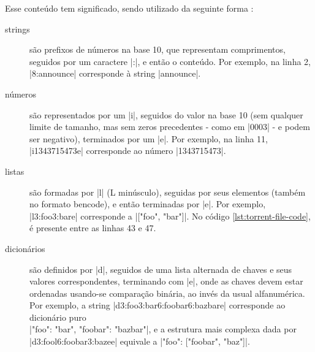 Esse conteúdo tem significado, sendo utilizado da seguinte forma
\cite{wikitheory:bencoding}:

\begin{description}
    \item[\glspl*{string}] são prefixos de números na base 10, que representam
        comprimentos, seguidos por um caractere \bverb|:|, e então o conteúdo. Por
        exemplo, na linha 2, \bverb|8:announce| corresponde à \gls*{string}
        \sverb|announce|.

    \item[números] são representados por um \bverb|i|, seguidos do valor na
        base 10 (sem qualquer limite de tamanho, mas sem zeros precedentes - como em
        \bverb|0003| - e podem ser negativo), terminados por um \bverb|e|. Por exemplo,
        na linha 11, \bverb|i1343715473e| corresponde ao número \sverb|1343715473|.

    \item[listas] são formadas por \bverb|l| (L minúsculo), seguidas por seus elementos
        (também no formato \gls*{bencode}), e então terminadas por \bverb|e|. Por
        exemplo, \bverb|l3:foo3:bare| corresponde a \sverb|["foo", "bar"]|. No código
        \ref{lst:torrent-file-code}, é presente entre as linhas 43 e 47.

    \item[dicionários] são definidos por \bverb|d|, seguidos de uma lista
        alternada de chaves e seus valores correspondentes, terminando com \bverb|e|,
        onde as chaves devem estar ordenadas usando-se comparação binária, ao invés da
        usual alfanumérica. Por exemplo, a \gls*{string}
        \bverb|d3:foo3:bar6:foobar6:bazbare| corresponde ao dicionário puro \\
        \sverb|{"foo": "bar", "foobar": "bazbar"}|, e a estrutura mais complexa dada por
        \\ \bverb|d3:fool6:foobar3:bazee| equivale a \sverb|{"foo": ["foobar", "baz"]}|.
\end{description}

